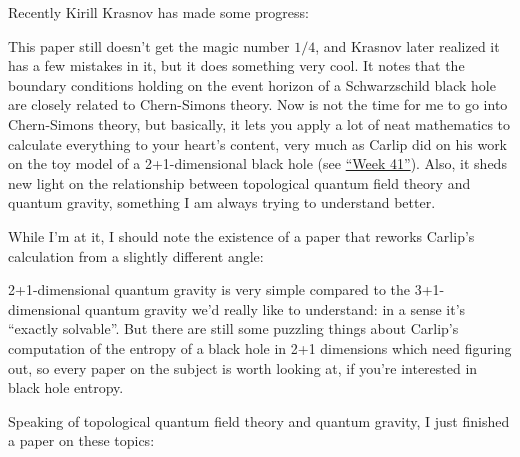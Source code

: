 \documentclass{article}
\def\tightlist{}
\renewcommand{\texttt}[1]{%
  \begingroup
  \ttfamily
  \begingroup\lccode`~=`/\lowercase{\endgroup\def~}{/\discretionary{}{}{}}%
  \begingroup\lccode`~=`[\lowercase{\endgroup\def~}{[\discretionary{}{}{}}%
  \begingroup\lccode`~=`.\lowercase{\endgroup\def~}{.\discretionary{}{}{}}%
  \catcode`/=\active\catcode`[=\active\catcode`.=\active
  \scantokens{#1\noexpand}%
  \endgroup
}
\begin{document}
Recently Kirill Krasnov has made some progress:


This paper still doesn't get the magic number \(1/4\), and Krasnov later
realized it has a few mistakes in it, but it does something very cool.
It notes that the boundary conditions holding on the event horizon of a
Schwarzschild black hole are closely related to Chern-Simons theory. Now
is not the time for me to go into Chern-Simons theory, but basically, it
lets you apply a lot of neat mathematics to calculate everything to your
heart's content, very much as Carlip did on his work on the toy model of
a 2+1-dimensional black hole (see \protect\hyperlink{week41}{``Week
41''}). Also, it sheds new light on the relationship between topological
quantum field theory and quantum gravity, something I am always trying
to understand better.

While I'm at it, I should note the existence of a paper that reworks
Carlip's calculation from a slightly different angle:


2+1-dimensional quantum gravity is very simple compared to the
3+1-dimensional quantum gravity we'd really like to understand: in a
sense it's ``exactly solvable''. But there are still some puzzling
things about Carlip's computation of the entropy of a black hole in 2+1
dimensions which need figuring out, so every paper on the subject is
worth looking at, if you're interested in black hole entropy.

Speaking of topological quantum field theory and quantum gravity, I just
finished a paper on these topics:

\end{document}
